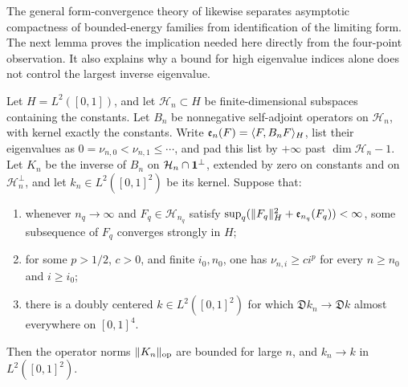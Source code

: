 The general form-convergence theory of
\cite[Definitions~2.11--2.13 and Theorem~2.4]{KuwaeShioya2003} likewise
separates asymptotic compactness of bounded-energy families from
identification of the limiting form.  The next lemma proves the implication
needed here directly from the four-point observation.  It also explains why
a bound for high eigenvalue indices alone does not control the largest
inverse eigenvalue.

\begin{lemma}
\label{lem:inverse-kernel-compactness}
Let \(H=L^2([0,1])\), and let \(\mathcal H_n\subset H\) be finite-dimensional
subspaces containing the constants.  Let \(B_n\) be nonnegative
self-adjoint operators on \(\mathcal H_n\), with kernel exactly the constants.
Write \(\mathfrak e_n(F)=\langle F,B_nF\rangle_H\), list their eigenvalues as
\(0=\nu_{n,0}<\nu_{n,1}\le\cdots\), and pad this list by \(+\infty\) past
\(\dim \mathcal H_n-1\).  Let \(K_n\) be the inverse of \(B_n\) on
\(\mathcal H_n\cap\mathbf 1^\perp\), extended by zero on constants and on \(\mathcal H_n^\perp\),
and let \(k_n\in L^2([0,1]^2)\) be its kernel.  Suppose that:
\begin{enumerate}[label=\textup{(\roman*)}]
\item whenever \(n_q\to\infty\) and \(F_q\in \mathcal H_{n_q}\) satisfy
\(\sup_q(\lVert F_q\rVert_H^2+\mathfrak e_{n_q}(F_q))<\infty\), some subsequence
of \(F_q\) converges strongly in \(H\);
\item for some \(p>1/2\), \(c>0\), and finite \(i_0,n_0\), one has
\(\nu_{n,i}\ge c i^p\) for every \(n\ge n_0\) and \(i\ge i_0\);
\item there is a doubly centered \(k\in L^2([0,1]^2)\) for which
\(\mathfrak Dk_n\to\mathfrak Dk\) almost everywhere on \([0,1]^4\).
\end{enumerate}
Then the operator norms \(\lVert K_n\rVert_{\mathrm{op}}\) are bounded for large
\(n\), and \(k_n\to k\) in \(L^2([0,1]^2)\).
\end{lemma}

